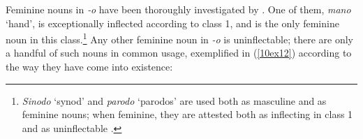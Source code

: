 \documentclass[output=paper,colorlinks,citecolor=brown]{langscibook}
\begin{document}
\begin{table}[H]
	\centering
	\caption{Treatment of recently borrowed masculine nouns in \emph{‑a} in the  corpus}
	\label{10tab13}
\end{table}


 \label{10sec3.2.3.3}

Feminine nouns in \emph{‑o} have been thoroughly investigated by \citet{dachillethornton2008}. One of them, \emph{mano} `hand', is exceptionally inflected according to class 1, and is the only feminine noun in this class.\footnote{\emph{Sinodo} `synod' and \emph{parodo} `parodos' are used both as masculine and as feminine nouns; when feminine, they are attested both as inflecting in class 1 and as uninflectable \citep[474]{dachillethornton2008}.} Any other feminine noun in \emph{-o} is uninflectable; there are only a handful of such nouns in common usage, exemplified in (\ref{10ex12}) according to the way they
have come into existence:
\end{document}
